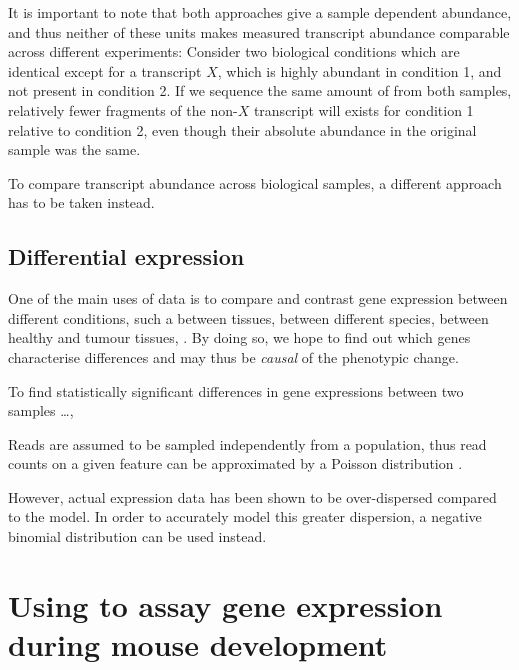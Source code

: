 It is important to note that both approaches give a sample dependent abundance,
and thus neither of these units makes measured transcript abundance comparable
across different experiments: Consider two biological conditions which are
identical except for a transcript \(X\), which is highly abundant in condition
\num{1}, and not present in condition \num{2}. If we sequence the same amount of
\mrna from both samples, relatively fewer fragments of the non-\(X\) transcript
will exists for condition \num{1} relative to condition \num{2}, even though
their absolute abundance in the original sample was the same.

To compare transcript abundance across biological samples, a different approach
has to be taken instead.

\subsection{Differential expression}

One of the main uses of \rnaseq data is to compare and contrast gene expression
between different conditions, such a between tissues, between different species,
between healthy and tumour tissues, \etc. By doing so, we hope to find out which
genes characterise differences and may thus be \emph{causal} of the phenotypic
change.


To find statistically significant differences in gene expressions between two
samples …,


Reads are assumed to be sampled independently from a population, thus
read counts on a given feature can be approximated by a Poisson distribution
\citep{Mortazavi:2008, Marioni:2008}.

However, actual expression data has been shown to be over-dispersed compared to
the model\citep{Robinson:2007}. In order to accurately model this greater
dispersion, a negative binomial distribution can be used instead.


\section{Using  to assay gene expression during mouse development}

